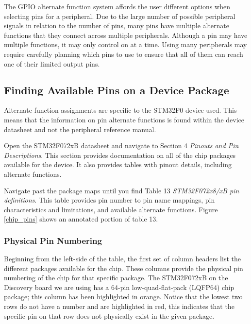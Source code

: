 \documentclass[openany,11pt,fleqn]{book} %
\begin{document}
The GPIO alternate function system affords the user different options when selecting pins for a peripheral. Due to the large number of possible peripheral signals in relation to the number of pins, many pins have multiple alternate functions that they connect across multiple peripherals. Although a pin may have multiple functions, it may only control on at a time. Using many peripherals may require carefully planning which pins to use to ensure that all of them can reach one of their limited output pins.  

%    
    
    \subsection{Finding Available Pins on a Device Package}
    
    Alternate function assignments are specific to the STM32F0 device used. This means that the information on pin alternate functions is found within the device datasheet and not the peripheral reference manual.
    
    Open the STM32F072xB datasheet and navigate to Section 4 \textit{Pinouts and Pin Descriptions}. This section provides documentation on all of the chip packages available for the device. It also provides tables with pinout details, including alternate functions.
    
    Navigate past the package maps until you find Table 13 \textit{STM32F072x8/xB pin definitions}. This table provides pin number to pin name mappings, pin characteristics and limitations, and available alternate functions. Figure \ref{chip_pins} shows an annotated portion of table 13. 
    
    \subsubsection{Physical Pin Numbering}
    Beginning from the left-side of the table, the first set of column headers list the different packages available for the chip. These columns provide the physical pin numbering of the chip for that specific package. The STM32F072xB on the Discovery board we are using has a 64-pin low-quad-flat-pack (LQFP64) chip package; this column has been highlighted in orange. Notice that the lowest two rows do not have a number and are highlighted in red, this indicates that the specific pin on that row does not physically exist in the given package. 
    
\end{document}
